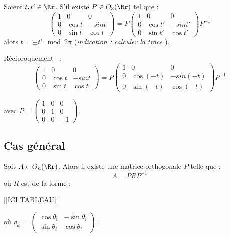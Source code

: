 \documentclass[class=report,crop=false]{standalone}
\begin{document}
\begin{exercicecours}
Soient $t,t' \in \Rr$. S'il existe $P \in O_3(\Rr)$ tel que :
\[ \left(\begin{array}{ccc}
1 & 0 & 0\\
0 & \cos t & -sin t\\
0 & \sin t & \cos t
\end{array}\right) =P\left(\begin{array}{ccc}
1 & 0 & 0\\
0 & \cos t' & -sin t'\\
0 & \sin t' & \cos t'
\end{array}\right)P^{-1}\]
 alors $t = \pm t' \mod 2\pi$ ({\it indication : calculer la trace }).

\og Réciproquement \fg\ : \[\left(\begin{array}{ccc}
1 & 0 & 0\\
0 & \cos t & -sin t\\
0 & \sin t & \cos t
\end{array}\right) = P\left(\begin{array}{ccc}
1 & 0 & 0\\
0 & \cos (-t) & -sin(-t) \\
0 & \sin (-t) & \cos (-t)
\end{array}\right)P^{-1}\] 

avec $P=\left(\begin{array}{ccc}
1&0&0\\
0&1&0\\
0&0&-1
\end{array}\right)$. 
\end{exercicecours}

\subsection{Cas général}





\begin{theoreme}
Soit $A \in O_n(\Rr)$. Alors il existe une matrice orthogonale $P$ telle que :
\[A = P RP^{-1}\]
où $R$ est de la forme :

[[ICI TABLEAU]]



où $\rho_{\theta_i} = \left(\begin{array}{cc}
\cos \theta_i & -\sin \theta_i\\
\sin \theta_i & \cos \theta_i
\end{array}\right)$.
\end{theoreme}
\end{document}
